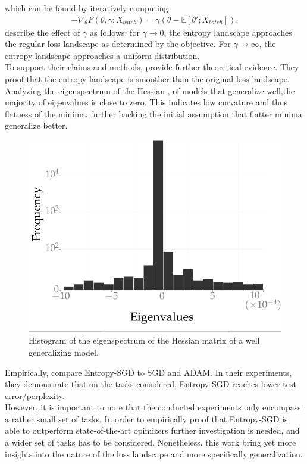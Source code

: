 \documentclass[a4paper]{scrartcl}
\begin{document}
which can be found by iteratively computing 
\begin{align}
	-\nabla_{\theta}F(\theta, \gamma; X_{batch}) = \gamma (\theta - \mathbb{E}\left[ \theta'; X_{batch} \right]).
\end{align}
\citet{chaudhari2019entropy} describe the effect of $\gamma$ as follows: for $\gamma \rightarrow 0$, the entropy landscape approaches the regular loss landscape as determined by the objective. For $\gamma \rightarrow \infty$, the entropy landscape approaches a uniform distribution.\\
To support their claims and methods, \citet{chaudhari2019entropy} provide further theoretical evidence. They proof that the entropy landscape is smoother than the original loss landscape. Analyzing the eigenspectrum of the Hessian \cite{bishop1992exact}, of models that generalize well,the majority of eigenvalues is close to zero. This indicates low curvature and thus flatness of the minima, further backing the initial assumption that flatter minima generalize better.\\
\begin{figure}[H]
	\centering
	\includegraphics[width=.5\linewidth]{figures/eigenspectrum.png}
	\caption{Histogram of the eigenspectrum of the Hessian matrix of a well generalizing model.}
	\label{fig:eigenspectrum}
\end{figure}
Empirically, \citet{chaudhari2019entropy} compare Entropy-SGD to SGD and ADAM. In their experiments, they demonstrate that on the tasks considered, Entropy-SGD reaches lower test error/perplexity.\\
However, it is important to note that the conducted experiments only encompass a rather small set of tasks. In order to empirically proof that Entropy-SGD is able to outperform state-of-the-art opimizers further investigation is needed, and a wider set of tasks has to be considered. Nonetheless, this work bring yet more insights into the nature of the loss landscape and more specifically generalization.
\end{document}
